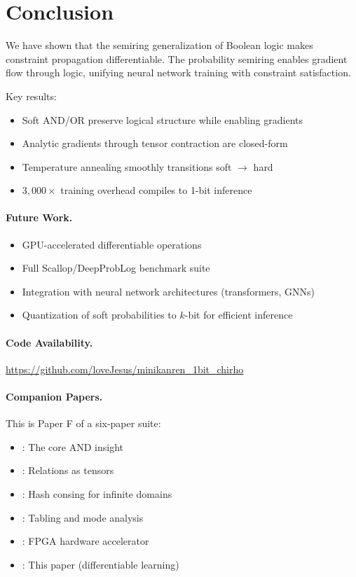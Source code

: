 \documentclass[11pt,a4paper]{article}
\begin{document}
\section{Conclusion}
\label{sec:conclusion_chirho}

We have shown that the semiring generalization of Boolean logic makes constraint propagation differentiable.
The probability semiring enables gradient flow through logic, unifying neural network training with constraint satisfaction.

Key results:
\begin{itemize}
  \item Soft AND/OR preserve logical structure while enabling gradients
  \item Analytic gradients through tensor contraction are closed-form
  \item Temperature annealing smoothly transitions soft $\to$ hard
  \item $3{,}000\times$ training overhead compiles to 1-bit inference
\end{itemize}

\paragraph{Future Work.}
\begin{itemize}
  \item GPU-accelerated differentiable operations
  \item Full Scallop/DeepProbLog benchmark suite
  \item Integration with neural network architectures (transformers, GNNs)
  \item Quantization of soft probabilities to $k$-bit for efficient inference
\end{itemize}

\paragraph{Code Availability.}
\url{https://github.com/loveJesus/minikanren_1bit_chirho}

\paragraph{Companion Papers.}
This is Paper F of a six-paper suite:
\begin{itemize}
  \item \paperA{}: The core AND insight
  \item \paperB{}: Relations as tensors
  \item \paperC{}: Hash consing for infinite domains
  \item \paperD{}: Tabling and mode analysis
  \item \paperE{}: FPGA hardware accelerator
  \item \paperF{}: This paper (differentiable learning)
\end{itemize}
\end{document}
